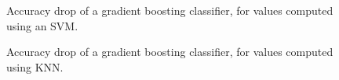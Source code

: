 \documentclass[10pt]{article}
\begin{document}
\begin{figure}[h]
  \caption{\label{fig:transfer-svm-gb}Accuracy drop of a gradient boosting
  classifier, for values computed using an SVM.}
\end{figure}

\begin{figure}[h]
  \caption{\label{fig:transfer-knn-gb}Accuracy drop of a gradient boosting
  classifier, for values computed using KNN.}
\end{figure}
\end{document}
